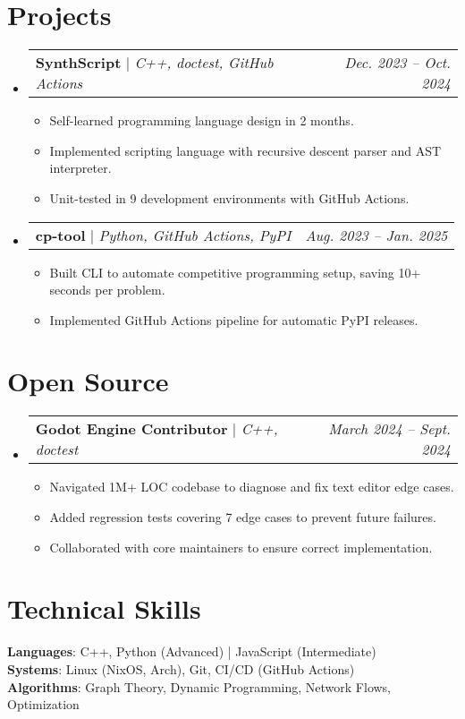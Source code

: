 \documentclass[letterpaper,11pt]{article}
\makeatletter
\newcommand{\resumeItem}[1]{
  \item\small{
    {#1 \vspace{-2pt}}
  }
}
\newcommand{\resumeProjectHeading}[2]{
    \item
    \begin{tabular*}{0.97\textwidth}{l@{\extracolsep{\fill}}r}
      \small#1 & \textit{#2} \\
    \end{tabular*}\vspace{-7pt}
}
\newcommand{\resumeSubHeadingListStart}{\begin{itemize}[leftmargin=0.15in, label={}]}
\newcommand{\resumeSubHeadingListEnd}{\end{itemize}}
\newcommand{\resumeItemListStart}{\begin{itemize}[leftmargin=0.23in]}
\newcommand{\resumeItemListEnd}{\end{itemize}\vspace{-5pt}}
\makeatother
\begin{document}
\section{Projects}
    \resumeSubHeadingListStart
      \resumeProjectHeading
          {\textbf{SynthScript} $|$ \emph{C++, doctest, GitHub Actions}}{Dec. 2023 -- Oct. 2024}
          \resumeItemListStart
            \resumeItem{Self-learned programming language design in 2 months.}
            \resumeItem{Implemented scripting language with recursive descent parser and AST interpreter.}
            \resumeItem{Unit-tested in 9 development environments with GitHub Actions.}
          \resumeItemListEnd
      \resumeProjectHeading
          {\textbf{cp-tool} $|$ \emph{Python, GitHub Actions, PyPI}}{Aug. 2023 -- Jan. 2025}
          \resumeItemListStart
            \resumeItem{Built CLI to automate competitive programming setup, saving 10+ seconds per problem.}
            \resumeItem{Implemented GitHub Actions pipeline for automatic PyPI releases.}
          \resumeItemListEnd
    \resumeSubHeadingListEnd


\section{Open Source}
    \resumeSubHeadingListStart
      \resumeProjectHeading
          {\textbf{Godot Engine Contributor} $|$ \emph{C++, doctest}}{March 2024 -- Sept. 2024}
          \resumeItemListStart
            \resumeItem{Navigated 1M+ LOC codebase to diagnose and fix text editor edge cases.}
            \resumeItem{Added regression tests covering 7 edge cases to prevent future failures.}
            \resumeItem{Collaborated with core maintainers to ensure correct implementation.}
          \resumeItemListEnd
    \resumeSubHeadingListEnd


\section{Technical Skills}
 \begin{itemize}[leftmargin=0.15in, label={}]
    \small{\item{
        \textbf{Languages}: C++, Python (Advanced) | JavaScript (Intermediate) \\
        \textbf{Systems}: Linux (NixOS, Arch), Git, CI/CD (GitHub Actions) \\
        \textbf{Algorithms}: Graph Theory, Dynamic Programming, Network Flows, Optimization \\
    }}
 \end{itemize}


\end{document}
